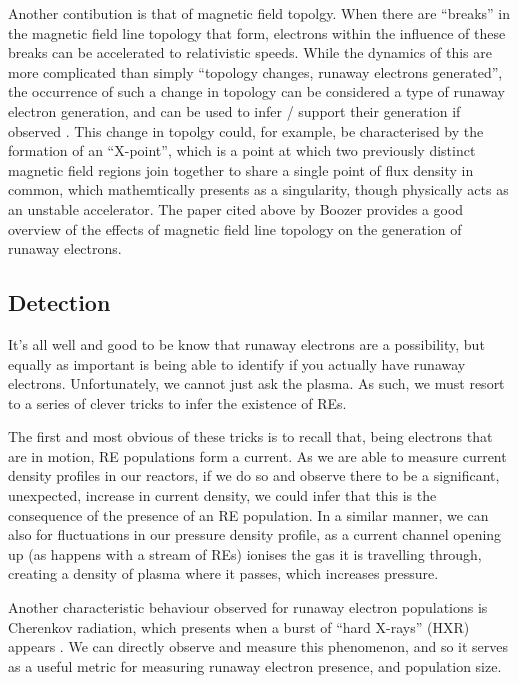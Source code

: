Another contibution is that of magnetic field topolgy. When there are ``breaks'' in the magnetic field line topology that form, 
electrons within the influence of these breaks can be accelerated to relativistic speeds. While the dynamics of this are more 
complicated than simply ``topology changes, runaway electrons generated'', the occurrence of such a change in topology can be 
considered a type of runaway electron generation, and can be used to infer / support their generation if observed \cite{runaway-electrons}.
This change in topolgy could, for example, be characterised by the formation of an ``X-point'', which is a point at which two previously 
distinct magnetic field regions join together to share a single point of flux density in common, which mathemtically presents as 
a singularity, though physically acts as an unstable accelerator. The paper cited above by Boozer provides a good overview of the effects of 
magnetic field line topology on the generation of runaway electrons.


\subsection{Detection}

It's all well and good to be know that runaway electrons are a possibility, but equally as important is being able 
to identify if you actually have runaway electrons. Unfortunately, we cannot just ask the plasma. As such, we must resort 
to a series of clever tricks to infer the existence of REs. 

The first and most obvious of these tricks is to recall that, being electrons that are in motion, RE populations form a current. As 
we are able to measure current density profiles in our reactors, if we do so and observe there to be a significant, unexpected, increase in 
current density, we could infer that this is the consequence of the presence of an RE population. In a similar manner, 
we can also for fluctuations in our pressure density profile, as a current channel opening up (as happens with a stream 
of REs) ionises the gas it is travelling through, creating a density of plasma where it passes, which 
increases pressure.

Another characteristic behaviour observed for runaway electron populations is Cherenkov radiation, 
which presents when a burst of ``hard X-rays'' (HXR) appears \cite{cherenkov-radiation}. We can directly 
observe and measure this phenomenon, and so it serves as a useful metric for measuring runaway electron presence, and
population size.


